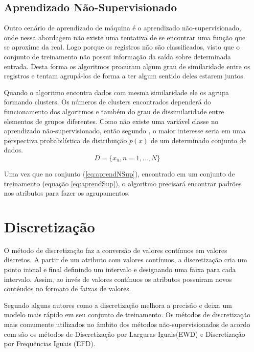 \subsection{Aprendizado Não-Supervisionado}\label{ssec:aprendNSup}

Outro cenário de aprendizado de máquina é o aprendizado não-supervisionado, onde nessa abordagem não existe uma tentativa de se encontrar uma função que se aproxime da real. Logo porque os registros não são classificados, visto que o conjunto de treinamento não possui informação da saída sobre determinada entrada. Desta forma os algoritmos procuram algum grau de similaridade entre os registros e tentam agrupá-los de forma a ter algum sentido deles estarem juntos. 

Quando o algoritmo encontra dados com mesma similaridade ele os agrupa formando clusters. Os números de clusters encontrados dependerá do funcionamento dos algoritmos e também do grau de dissimilaridade entre elementos de grupos diferentes. Como não existe uma variável classe no aprendizado não-supervisionado, então segundo , o maior interesse seria em uma perspectiva probabilística de distribuição ${p(x)}$ de um determinado conjunto de dados.
\begin{equation}
 D = \{x_{n},n=1,...,N\}
 \label{eq:aprendNSup}
\end{equation}

Uma vez que no conjunto (\ref{eq:aprendNSup}), encontrado em um conjunto de treinamento (equação \ref{eq:aprendSup}), o algoritmo precisará encontrar padrões nos atributos para fazer os agrupamentos.


\section{Discretização}\label{cap:refTeor:sec:discret}

O método de discretização faz a conversão de valores contínuos em valores discretos. A partir de um atributo com valores contínuos, a discretização cria um ponto inicial e final definindo um intervalo e designando uma faixa para cada intervalo. Assim, ao invés de valores contínuos os atributos possuiram novos contéudos no formato de faixas de valores.

Segundo alguns autores como  a discretização melhora a precisão e deixa um modelo mais rápido em seu conjunto de treinamento. Os métodos de discretização mais comumente utilizados no âmbito dos métodos  não-supervisionados de acordo com  são os métodos de Discretização por Larguras Iguais(EWD) e Discretização por Frequências Iguais (EFD).

